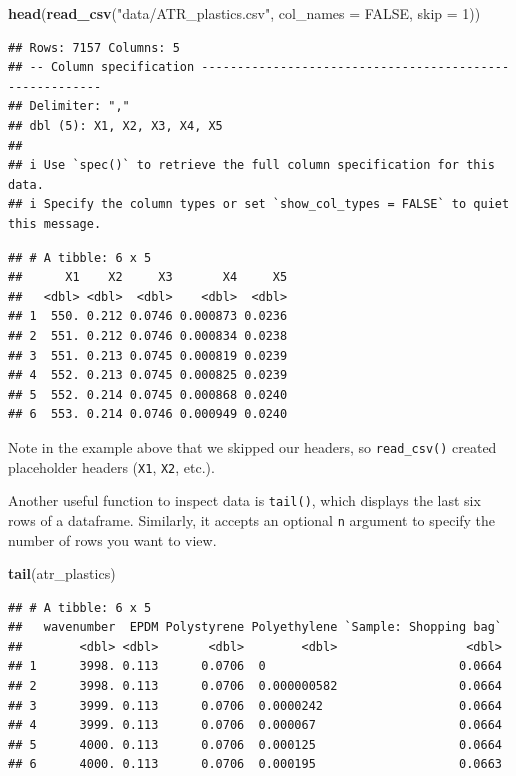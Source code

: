 \documentclass[
]{book}
\newenvironment{Shaded}{\begin{snugshade}}{\end{snugshade}}
\newcommand{\AttributeTok}[1]{\textcolor[rgb]{0.13,0.29,0.53}{#1}}
\newcommand{\ConstantTok}[1]{\textcolor[rgb]{0.56,0.35,0.01}{#1}}
\newcommand{\DecValTok}[1]{\textcolor[rgb]{0.00,0.00,0.81}{#1}}
\newcommand{\FunctionTok}[1]{\textcolor[rgb]{0.13,0.29,0.53}{\textbf{#1}}}
\newcommand{\NormalTok}[1]{#1}
\newcommand{\StringTok}[1]{\textcolor[rgb]{0.31,0.60,0.02}{#1}}
\begin{document}
\begin{Shaded}
\begin{Highlighting}[]
\FunctionTok{head}\NormalTok{(}\FunctionTok{read\_csv}\NormalTok{(}\StringTok{"data/ATR\_plastics.csv"}\NormalTok{, }\AttributeTok{col\_names =} \ConstantTok{FALSE}\NormalTok{, }\AttributeTok{skip =} \DecValTok{1}\NormalTok{))}
\end{Highlighting}
\end{Shaded}

\begin{verbatim}
## Rows: 7157 Columns: 5
## -- Column specification --------------------------------------------------------
## Delimiter: ","
## dbl (5): X1, X2, X3, X4, X5
## 
## i Use `spec()` to retrieve the full column specification for this data.
## i Specify the column types or set `show_col_types = FALSE` to quiet this message.
\end{verbatim}

\begin{verbatim}
## # A tibble: 6 x 5
##      X1    X2     X3       X4     X5
##   <dbl> <dbl>  <dbl>    <dbl>  <dbl>
## 1  550. 0.212 0.0746 0.000873 0.0236
## 2  551. 0.212 0.0746 0.000834 0.0238
## 3  551. 0.213 0.0745 0.000819 0.0239
## 4  552. 0.213 0.0745 0.000825 0.0239
## 5  552. 0.214 0.0745 0.000868 0.0240
## 6  553. 0.214 0.0746 0.000949 0.0240
\end{verbatim}

Note in the example above that we skipped our headers, so \texttt{read\_csv()} created placeholder headers (\texttt{X1}, \texttt{X2}, etc.).

Another useful function to inspect data is \texttt{tail()}, which displays the last six rows of a dataframe. Similarly, it accepts an optional \texttt{n} argument to specify the number of rows you want to view.

\begin{Shaded}
\begin{Highlighting}[]
\FunctionTok{tail}\NormalTok{(atr\_plastics)}
\end{Highlighting}
\end{Shaded}

\begin{verbatim}
## # A tibble: 6 x 5
##   wavenumber  EPDM Polystyrene Polyethylene `Sample: Shopping bag`
##        <dbl> <dbl>       <dbl>        <dbl>                  <dbl>
## 1      3998. 0.113      0.0706  0                           0.0664
## 2      3998. 0.113      0.0706  0.000000582                 0.0664
## 3      3999. 0.113      0.0706  0.0000242                   0.0664
## 4      3999. 0.113      0.0706  0.000067                    0.0664
## 5      4000. 0.113      0.0706  0.000125                    0.0664
## 6      4000. 0.113      0.0706  0.000195                    0.0663
\end{verbatim}
\end{document}
